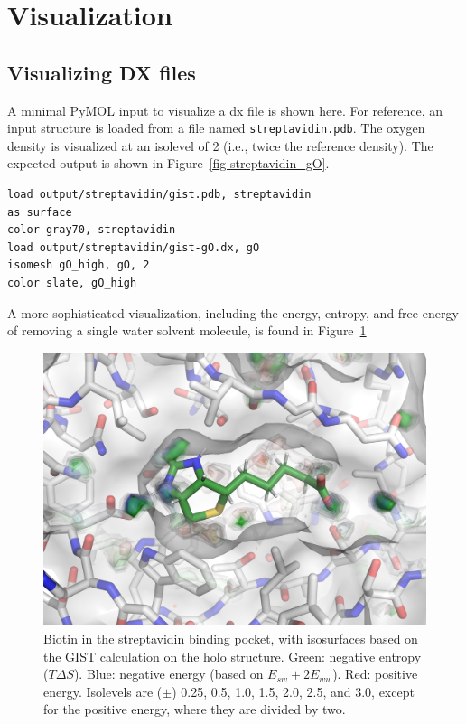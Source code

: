 \documentclass[9pt,tutorial]{livecoms}
\newcommand\inlinecode{\texttt}
\begin{document}
\section{Visualization}
\label{sec:visualization}
\subsection{Visualizing DX files}
A minimal PyMOL input to visualize a dx file is shown here.
For reference, an input structure is loaded from a file named \inlinecode{streptavidin.pdb}.
The oxygen density is visualized at an isolevel of 2 (i.e., twice the reference density).
The expected output is shown in Figure~\ref{fig-streptavidin_gO}.

\begin{lstlisting}[style=pymol]
load output/streptavidin/gist.pdb, streptavidin
as surface
color gray70, streptavidin
load output/streptavidin/gist-gO.dx, gO
isomesh gO_high, gO, 2
color slate, gO_high
\end{lstlisting}

A more sophisticated visualization, including the energy, entropy, and free energy of removing a single water solvent molecule, is found in Figure~\ref{fig-binding-pocket.png}

\begin{figure}
	\centering
	\includegraphics[width=\linewidth]{figures/binding-pocket-energy-levels.png}
	\caption{Biotin in the streptavidin binding pocket, with isosurfaces based on the GIST calculation on the holo structure. Green: negative entropy ($T\Delta S$). Blue: negative energy (based on $E_{sw} + 2E_{ww}$). Red: positive energy. Isolevels are ($\pm$) 0.25, 0.5, 1.0, 1.5, 2.0, 2.5, and 3.0, except for the positive energy, where they are divided by two.}\label{fig-binding-pocket.png}
\end{figure}
\end{document}
